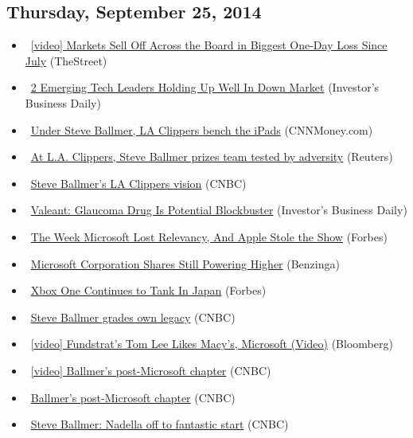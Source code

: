 \documentclass[11pt,asymmetric]{article}
\begin{document}
\subsection*{Thursday, September 25, 2014}
\begin{itemize}
\item\ \href{http://www.thestreet.com/_yahoo/story/12893097/1/markets-sell-off-across-the-board-biggest-one-day-loss-since-july.html?cm_ven=YAHOOV&cm_cat=FREE&cm_ite=NA}{[video] Markets Sell Off Across the Board in Biggest One-Day Loss Since July} (TheStreet)
\item\ \href{http://news.investors.com/092514-719029-palo-alto-networks-arista-networks-show-strength.htm?ven=yahoocp&src=aurlled&ven=yahoo}{2 Emerging Tech Leaders Holding Up Well In Down Market} (Investor's Business Daily)
\item\ \href{http://finance.yahoo.com/news/under-steve-ballmer-la-clippers-192400043.html}{Under Steve Ballmer, LA Clippers bench the iPads} (CNNMoney.com)
\item\ \href{http://finance.yahoo.com/news/l-clippers-steve-ballmer-prizes-013520178.html}{At L.A. Clippers, Steve Ballmer prizes team tested by adversity} (Reuters)
\item\ \href{http://finance.yahoo.com/video/steve-ballmers-la-clippers-vision-175400787.html}{Steve Ballmer's LA Clippers vision} (CNBC)
\item\ \href{http://news.investors.com/092514-718979-vrx-stock-rises-vesneo-trial-succeeds.htm?ven=yahoocp&src=aurlled&ven=yahoo}{Valeant: Glaucoma Drug Is Potential Blockbuster} (Investor's Business Daily)
\item\ \href{http://www.forbes.com/sites/adamhartung/2014/09/25/the-week-microsoft-lost-relevancy-and-apple-stole-the-show/?partner=yahootix}{The Week Microsoft Lost Relevancy, And Apple Stole the Show} (Forbes)
\item\ \href{http://finance.yahoo.com/news/microsoft-corporation-shares-still-powering-153412348.html}{Microsoft Corporation Shares Still Powering Higher} (Benzinga)
\item\ \href{http://www.forbes.com/sites/davidthier/2014/09/25/xbox-one-continues-to-tank-in-japan/?partner=yahootix}{Xbox One Continues to Tank In Japan} (Forbes)
\item\ \href{http://finance.yahoo.com/video/steve-ballmer-grades-own-legacy-151500329.html}{Steve Ballmer grades own legacy} (CNBC)
\item\ \href{http://www.bloomberg.com/video/fundstrat-s-tom-lee-on-stocks-investment-strategy-M9Zv564rTmG5rDkNV2ajDg.html?cmpid=yhoo}{[video] Fundstrat's Tom Lee Likes Macy's, Microsoft (Video)} (Bloomberg)
\item\ \href{http://video.cnbc.com/gallery/?video=3000313638&__source=yahoo%7cheadline%7cquote%7cvideo%7c&par=yahoo}{[video] Ballmer's post-Microsoft chapter} (CNBC)
\item\ \href{http://finance.yahoo.com/video/ballmers-post-microsoft-chapter-140700812.html}{Ballmer's post-Microsoft chapter} (CNBC)
\item\ \href{http://finance.yahoo.com/video/steve-ballmer-nadella-off-fantastic-131500214.html}{Steve Ballmer: Nadella off to fantastic start} (CNBC)
\end{itemize}
\end{document}
